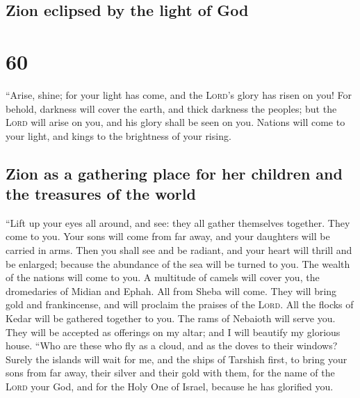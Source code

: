 \hypertarget{zion-eclipsed-by-the-light-of-god}{%
\subsection{Zion eclipsed by the light of
God}\label{zion-eclipsed-by-the-light-of-god}}

\hypertarget{section-59}{%
\section{60}\label{section-59}}

 ``Arise, shine; for your light has come, and the
\textsc{Lord}'s glory has risen on you!  For behold,
darkness will cover the earth, and thick darkness the peoples; but the
\textsc{Lord} will arise on you, and his glory shall be seen on you.
 Nations will come to your light, and kings to the
brightness of your rising.

\hypertarget{zion-as-a-gathering-place-for-her-children-and-the-treasures-of-the-world}{%
\subsection{Zion as a gathering place for her children and the treasures
of the
world}\label{zion-as-a-gathering-place-for-her-children-and-the-treasures-of-the-world}}

 ``Lift up your eyes all around, and see: they all gather
themselves together. They come to you. Your sons will come from far
away, and your daughters will be carried in arms.  Then
you shall see and be radiant, and your heart will thrill and be
enlarged; because the abundance of the sea will be turned to you. The
wealth of the nations will come to you.  A multitude of
camels will cover you, the dromedaries of Midian and Ephah. All from
Sheba will come. They will bring gold and frankincense, and will
proclaim the praises of the \textsc{Lord}.  All the flocks
of Kedar will be gathered together to you. The rams of Nebaioth will
serve you. They will be accepted as offerings on my altar; and I will
beautify my glorious house.  ``Who are these who fly as a
cloud, and as the doves to their windows?  Surely the
islands will wait for me, and the ships of Tarshish first, to bring your
sons from far away, their silver and their gold with them, for the name
of the \textsc{Lord} your God, and for the Holy One of Israel, because
he has glorified you.

